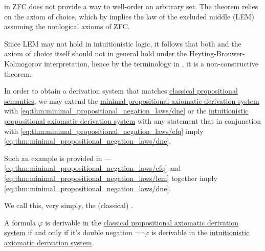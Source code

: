 \begin{example}\label{ex:def:brouwer_heyting_kolmogorov_interpretation/well_ordering_principle_zfc}
   in \hyperref[def:set]{ZFC} does not provide a way to well-order an arbitrary set. The theorem relies on the axiom of choice, which by  implies the law of the excluded middle (LEM) assuming the nonlogical axioms of ZFC.

  Since LEM may not hold in intuitionistic logic, it follows that both  and the axiom of choice itself should not in general hold under the Heyting-Brouwer-Kolmogorov interpretation, hence by the terminology in , it is a non-constructive theorem.
\end{example}

\begin{definition}\label{def:propositional_axiomatic_derivation_system}
  In order to obtain a derivation system that matches \hyperref[def:propositional_semantics]{classical propositional semantics}, we may extend the \hyperref[def:minimal_propositional_axiomatic_derivation_system]{minimal propositional axiomatic derivation system} with \eqref{eq:thm:minimal_propositional_negation_laws/dne} or the \hyperref[def:intuitionistic_propositional_axiomatic_derivation_system]{intuitionistic propositional axiomatic derivation system} with any statement that in conjunction with \eqref{eq:thm:minimal_propositional_negation_laws/efq} imply \eqref{eq:thm:minimal_propositional_negation_laws/dne}.

  Such an example is provided in  --- \eqref{eq:thm:minimal_propositional_negation_laws/efq} and \eqref{eq:thm:minimal_propositional_negation_laws/lem} together imply \eqref{eq:thm:minimal_propositional_negation_laws/dne}.

  We call this, very simply, the (classical) .
\end{definition}

\begin{theorem}\label{thm:glivenkos_double_negation_theorem}
  A formula \( \varphi \) is derivable in the \hyperref[def:propositional_axiomatic_derivation_system]{classical propositional axiomatic derivation system} if and only if it's double negation \( \neg \neg \varphi \) is derivable in the \hyperref[def:intuitionistic_propositional_axiomatic_derivation_system]{intuitionistic axiomatic derivation system}.
\end{theorem}

